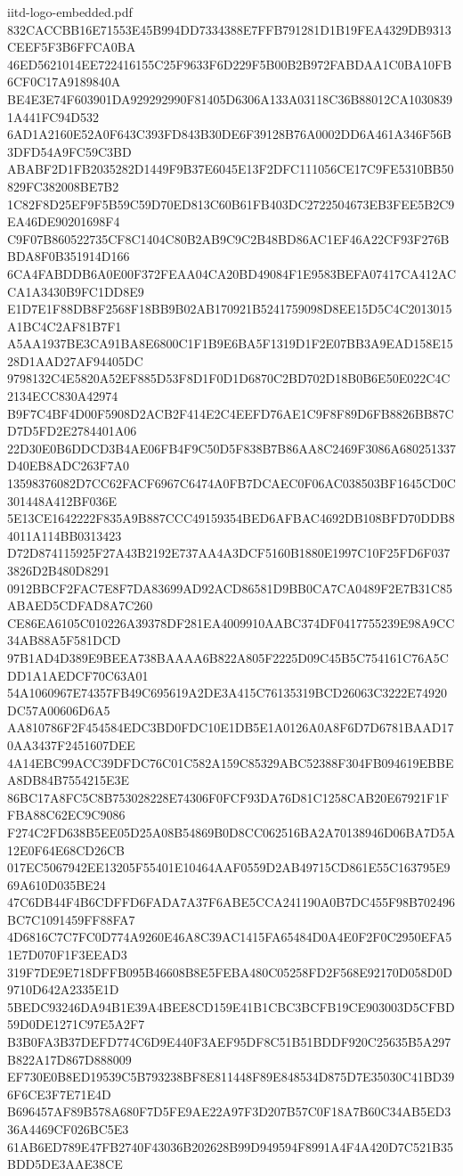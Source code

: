 \begin{filecontents*}[overwrite]{iitd-logo-embedded.pdf}
832CACCBB16E71553E45B994DD7334388E7FFB791281D1B19FEA4329DB9313CEEF5F3B6FFCA0BA
46ED5621014EE722416155C25F9633F6D229F5B00B2B972FABDAA1C0BA10FB6CF0C17A9189840A
BE4E3E74F603901DA929292990F81405D6306A133A03118C36B88012CA10308391A441FC94D532
6AD1A2160E52A0F643C393FD843B30DE6F39128B76A0002DD6A461A346F56B3DFD54A9FC59C3BD
ABABF2D1FB2035282D1449F9B37E6045E13F2DFC111056CE17C9FE5310BB50829FC382008BE7B2
1C82F8D25EF9F5B59C59D70ED813C60B61FB403DC2722504673EB3FEE5B2C9EA46DE90201698F4
C9F07B860522735CF8C1404C80B2AB9C9C2B48BD86AC1EF46A22CF93F276BBDA8F0B351914D166
6CA4FABDDB6A0E00F372FEAA04CA20BD49084F1E9583BEFA07417CA412ACCA1A3430B9FC1DD8E9
E1D7E1F88DB8F2568F18BB9B02AB170921B5241759098D8EE15D5C4C2013015A1BC4C2AF81B7F1
A5AA1937BE3CA91BA8E6800C1F1B9E6BA5F1319D1F2E07BB3A9EAD158E1528D1AAD27AF94405DC
9798132C4E5820A52EF885D53F8D1F0D1D6870C2BD702D18B0B6E50E022C4C2134ECC830A42974
B9F7C4BF4D00F5908D2ACB2F414E2C4EEFD76AE1C9F8F89D6FB8826BB87CD7D5FD2E2784401A06
22D30E0B6DDCD3B4AE06FB4F9C50D5F838B7B86AA8C2469F3086A680251337D40EB8ADC263F7A0
13598376082D7CC62FACF6967C6474A0FB7DCAEC0F06AC038503BF1645CD0C301448A412BF036E
5E13CE1642222F835A9B887CCC49159354BED6AFBAC4692DB108BFD70DDB84011A114BB0313423
D72D874115925F27A43B2192E737AA4A3DCF5160B1880E1997C10F25FD6F0373826D2B480D8291
0912BBCF2FAC7E8F7DA83699AD92ACD86581D9BB0CA7CA0489F2E7B31C85ABAED5CDFAD8A7C260
CE86EA6105C010226A39378DF281EA4009910AABC374DF0417755239E98A9CC34AB88A5F581DCD
97B1AD4D389E9BEEA738BAAAA6B822A805F2225D09C45B5C754161C76A5CDD1A1AEDCF70C63A01
54A1060967E74357FB49C695619A2DE3A415C76135319BCD26063C3222E74920DC57A00606D6A5
AA810786F2F454584EDC3BD0FDC10E1DB5E1A0126A0A8F6D7D6781BAAD170AA3437F2451607DEE
4A14EBC99ACC39DFDC76C01C582A159C85329ABC52388F304FB094619EBBEA8DB84B7554215E3E
86BC17A8FC5C8B753028228E74306F0FCF93DA76D81C1258CAB20E67921F1FFBA88C62EC9C9086
F274C2FD638B5EE05D25A08B54869B0D8CC062516BA2A70138946D06BA7D5A12E0F64E68CD26CB
017EC5067942EE13205F55401E10464AAF0559D2AB49715CD861E55C163795E969A610D035BE24
47C6DB44F4B6CDFFD6FADA7A37F6ABE5CCA241190A0B7DC455F98B702496BC7C1091459FF88FA7
4D6816C7C7FC0D774A9260E46A8C39AC1415FA65484D0A4E0F2F0C2950EFA51E7D070F1F3EEAD3
319F7DE9E718DFFB095B46608B8E5FEBA480C05258FD2F568E92170D058D0D9710D642A2335E1D
5BEDC93246DA94B1E39A4BEE8CD159E41B1CBC3BCFB19CE903003D5CFBD59D0DE1271C97E5A2F7
B3B0FA3B37DEFD774C6D9E440F3AEF95DF8C51B51BDDF920C25635B5A297B822A17D867D888009
EF730E0B8ED19539C5B793238BF8E811448F89E848534D875D7E35030C41BD396F6CE3F7E71E4D
B696457AF89B578A680F7D5FE9AE22A97F3D207B57C0F18A7B60C34AB5ED336A4469CF026BC5E3
61AB6ED789E47FB2740F43036B202628B99D949594F8991A4F4A420D7C521B35BDD5DE3AAE38CE

\end{filecontents*}
